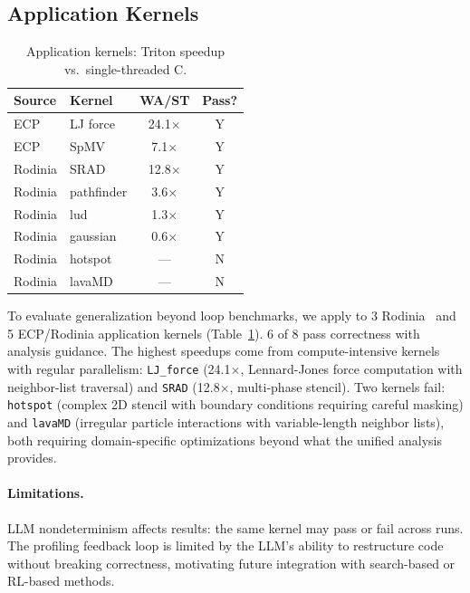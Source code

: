 \subsection{Application Kernels}

\begin{table}[t]
  \caption{Application kernels: Triton speedup vs.\ single-threaded C.}
  \label{tab:realworld}
  \centering\small
  \begin{tabular}{llcc}
    \toprule
    \textbf{Source} & \textbf{Kernel} & \textbf{WA/ST} & \textbf{Pass?} \\
    \midrule
    ECP     & LJ force   & 24.1$\times$ & Y \\
    ECP     & SpMV       & 7.1$\times$  & Y \\
    Rodinia & SRAD       & 12.8$\times$ & Y \\
    Rodinia & pathfinder & 3.6$\times$  & Y \\
    Rodinia & lud        & 1.3$\times$  & Y \\
    Rodinia & gaussian   & 0.6$\times$  & Y \\
    \midrule
    Rodinia & hotspot    & ---          & N \\
    Rodinia & lavaMD     & ---          & N \\
    \bottomrule
  \end{tabular}
\end{table}

To evaluate generalization beyond loop benchmarks, we apply \sysname to 3 Rodinia~\cite{che2009rodinia} and 5 ECP/Rodinia application kernels (Table~\ref{tab:realworld}).
6 of 8 pass correctness with analysis guidance.
The highest speedups come from compute-intensive kernels with regular parallelism: \texttt{LJ\_force} (24.1$\times$, Lennard-Jones force computation with neighbor-list traversal) and \texttt{SRAD} (12.8$\times$, multi-phase stencil).
Two kernels fail: \texttt{hotspot} (complex 2D stencil with boundary conditions requiring careful masking) and \texttt{lavaMD} (irregular particle interactions with variable-length neighbor lists), both requiring domain-specific optimizations beyond what the unified analysis provides.

\paragraph{Limitations.}
LLM nondeterminism affects results: the same kernel may pass or fail across runs. The profiling feedback loop is limited by the LLM's ability to restructure code without breaking correctness, motivating future integration with search-based or RL-based methods.
